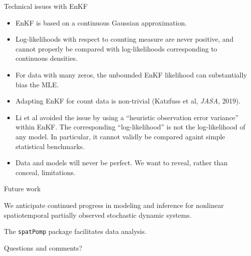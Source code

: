 \documentclass{beamer}
\begin{document}
\begin{frame}{Technical issues with EnKF}

  \begin{itemize}
  \item EnKF is based on a continuous Gaussian approximation.
  \item Log-likelihoods with respect to counting measure are never positive, and cannot properly be compared with log-likelihoods corresponding to continuous densities.
    \item For data with many zeros, the unbounded EnKF likelihood can substantially bias the MLE.
    \item Adapting EnKF for count data is non-trivial (Katzfuss et al, {\it JASA}, 2019).
    \item Li et al avoided the issue by using a ``heuristic observation error variance'' within EnKF. The corresponding ``log-likelihood'' is not the log-likelihood of any model. In particular, it cannot validly be compared againt simple statistical benchmarks.
  \item Data and models will never be perfect. We want to reveal, rather than conceal, limitations.
  \end{itemize}
  
  \end{frame}

\begin{frame}{Future work}

  \newcommand\futuresep{\vspace{5mm}}
  
  \begin{myitemize}

  \item We anticipate continued progress in modeling and inference for nonlinear spatiotemporal partially observed stochastic dynamic systems.

    \futuresep
    
  \item The \texttt{spatPomp} package facilitates data analysis.

    \futuresep

    \item Questions and comments?
    
\end{myitemize}

\end{frame}
\end{document}
